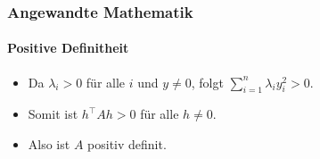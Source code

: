 \documentclass{beamer}
\begin{document}
 \begin{frame}
    \frametitle{Angewandte Mathematik}
    \framesubtitle{Positive Definitheit}
     \begin{itemize}
         \item Da \( \lambda_i > 0 \) für alle \( i \) und \( y \neq 0 \), folgt \( \sum_{i=1}^n \lambda_i y_i^2 > 0 \).
         \item Somit ist \( h^\top A h > 0 \) für alle \( h \neq 0 \).
         \item Also ist \( A \) positiv definit.
     \end{itemize}
 \end{frame}
 
 
\end{document}
